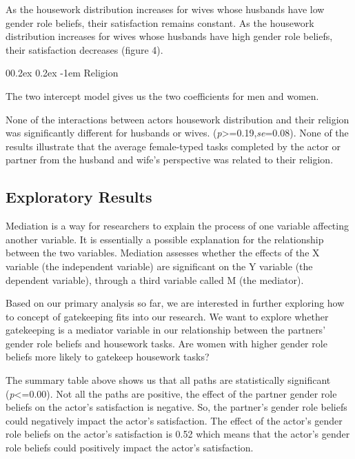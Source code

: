 \documentclass[
  man,floatsintext]{apa6}
\makeatletter
\let\oldparagraph\paragraph
\renewcommand{\paragraph}[1]{\oldparagraph{#1}\mbox{}}
\renewcommand{\paragraph}{\@startsection{paragraph}{4}{\parindent}%
  {0\baselineskip \@plus 0.2ex \@minus 0.2ex}%
  {-1em}%
  {\normalfont\normalsize\bfseries\itshape\typesectitle}}
\makeatother
\begin{document}
As the housework distribution increases for wives whose husbands have low gender role beliefs, their satisfaction remains constant. As the housework distribution increases for wives whose husbands have high gender role beliefs, their satisfaction decreases (figure 4).

\hypertarget{religion}{%
\paragraph{Religion}\label{religion}}

The two intercept model gives us the two coefficients for men and women.

None of the interactions between actors housework distribution and their religion was significantly different for husbands or wives. (\emph{p}\textgreater=0.19,\emph{se}=0.08). None of the results illustrate that the average female-typed tasks completed by the actor or partner from the husband and wife's perspective was related to their religion.

\hypertarget{exploratory-results}{%
\subsection{Exploratory Results}\label{exploratory-results}}

Mediation is a way for researchers to explain the process of one variable affecting another variable. It is essentially a possible explanation for the relationship between the two variables. Mediation assesses whether the effects of the X variable (the independent variable) are significant on the Y variable (the dependent variable), through a third variable called M (the mediator).

Based on our primary analysis so far, we are interested in further exploring how to concept of gatekeeping fits into our research. We want to explore whether gatekeeping is a mediator variable in our relationship between the partners' gender role beliefs and housework tasks. Are women with higher gender role beliefs more likely to gatekeep housework tasks?

The summary table above shows us that all paths are statistically significant (\emph{p}\textless=0.00). Not all the paths are positive, the effect of the partner gender role beliefs on the actor's satisfaction is negative. So, the partner's gender role beliefs could negatively impact the actor's satisfaction. The effect of the actor's gender role beliefs on the actor's satisfaction is 0.52 which means that the actor's gender role beliefs could positively impact the actor's satisfaction.
\end{document}
